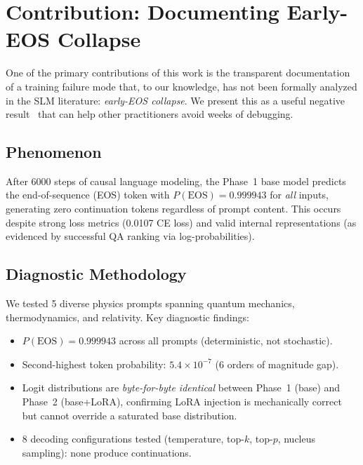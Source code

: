 \documentclass[11pt]{article}
\begin{document}
\section{Contribution: Documenting Early-EOS Collapse}
\label{sec:failure}

One of the primary contributions of this work is the transparent documentation of a training failure mode that, to our knowledge, has not been formally analyzed in the SLM literature: \emph{early-EOS collapse}. We present this as a useful negative result~\cite{negresults} that can help other practitioners avoid weeks of debugging.

\subsection{Phenomenon}

After 6000 steps of causal language modeling, the Phase~1 base model predicts the end-of-sequence (EOS) token with $P(\text{EOS}) = 0.999943$ for \emph{all} inputs, generating zero continuation tokens regardless of prompt content. This occurs despite strong loss metrics (0.0107 CE loss) and valid internal representations (as evidenced by successful QA ranking via log-probabilities).

\subsection{Diagnostic Methodology}

We tested 5 diverse physics prompts spanning quantum mechanics, thermodynamics, and relativity. Key diagnostic findings:

\begin{itemize}[leftmargin=*]
    \item $P(\text{EOS}) = 0.999943$ across all prompts (deterministic, not stochastic).
    \item Second-highest token probability: $5.4 \times 10^{-7}$ (6 orders of magnitude gap).
    \item Logit distributions are \emph{byte-for-byte identical} between Phase~1 (base) and Phase~2 (base+LoRA), confirming LoRA injection is mechanically correct but cannot override a saturated base distribution.
    \item 8 decoding configurations tested (temperature, top-$k$, top-$p$, nucleus sampling): none produce continuations.
\end{itemize}
\end{document}
